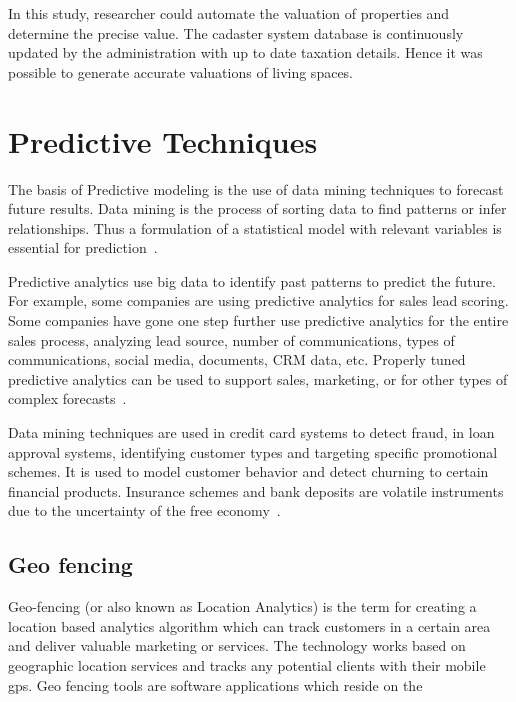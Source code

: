 In this study, researcher could automate the valuation of properties and determine the precise value. The cadaster system database is continuously updated by the administration with up to date taxation details. Hence it was possible to generate accurate valuations of living spaces.

%
%
%
%

\setlength{\footskip}{8mm}

\chapter{Predictive Techniques} 
\label{predictive-techniques}

The basis of Predictive modeling is the use of data mining techniques to forecast future results. Data mining is the process of sorting data to find patterns or infer relationships. Thus a formulation of a statistical model with relevant variables is essential for prediction~. 

Predictive analytics use big data to identify past patterns to predict the future. For example, some companies are using predictive analytics for sales lead scoring. Some companies have gone one step further use predictive analytics for the entire sales process, analyzing lead source, number of communications, types of communications, social media, documents, CRM data, etc. Properly tuned predictive analytics can be used to support sales, marketing, or for other types of complex forecasts~.

Data mining techniques are used in credit card systems to detect fraud, in loan approval systems, identifying customer types and targeting specific promotional schemes. It is used to model customer behavior and detect churning to certain financial products. Insurance schemes and bank deposits are volatile instruments due to the uncertainty of the free economy~.


%
%

%
%
%
%
\newpage
\section{Geo fencing}
Geo-fencing (or also known as Location Analytics) is the term for creating a location based analytics algorithm which can track customers in a certain area and deliver valuable marketing or services. The technology works based on geographic location services and tracks any potential clients with their mobile gps. 
Geo fencing tools are software applications which reside on the 

